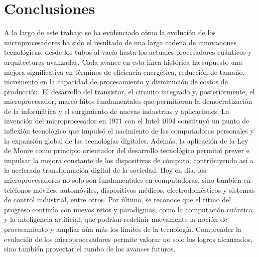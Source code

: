 \documentclass[]{article}
\begin{document}
\section{Conclusiones}
A lo largo de este trabajo se ha evidenciado cómo la evolución de los microprocesadores ha sido el resultado de una larga cadena de innovaciones tecnológicas, desde los tubos al vacío hasta los actuales procesadores cuánticos y arquitecturas avanzadas. Cada avance en esta línea histórica ha supuesto una mejora significativa en términos de eficiencia energética, reducción de tamaño, incremento en la capacidad de procesamiento y disminución de costos de producción.
El desarrollo del transistor, el circuito integrado y, posteriormente, el microprocesador, marcó hitos fundamentales que permitieron la democratización de la informática y el surgimiento de nuevas industrias y aplicaciones. La invención del microprocesador en 1971 con el Intel 4004 constituyó un punto de inflexión tecnológico que impulsó el nacimiento de las computadoras personales y la expansión global de las tecnologías digitales.
Además, la aplicación de la Ley de Moore como principio orientador del desarrollo tecnológico permitió prever e impulsar la mejora constante de los dispositivos de cómputo, contribuyendo así a la acelerada transformación digital de la sociedad. Hoy en día, los microprocesadores no solo son fundamentales en computadoras, sino también en teléfonos móviles, automóviles, dispositivos médicos, electrodomésticos y sistemas de control industrial, entre otros.
Por último, se reconoce que el ritmo del progreso continúa con nuevos retos y paradigmas, como la computación cuántica y la inteligencia artificial, que podrían redefinir nuevamente la noción de procesamiento y ampliar aún más los límites de la tecnología. Comprender la evolución de los microprocesadores permite valorar no solo los logros alcanzados, sino también proyectar el rumbo de los avances futuros.
\end{document}
